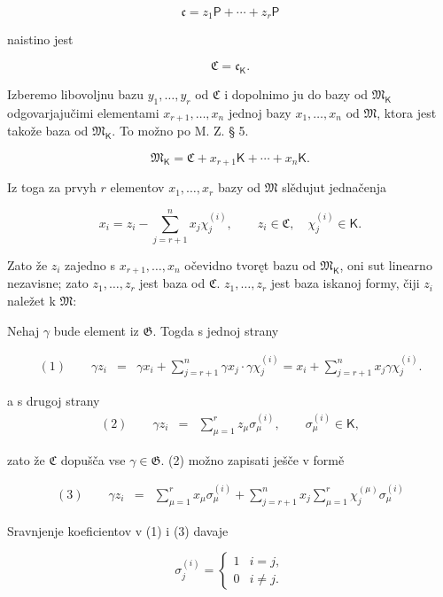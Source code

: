 \documentclass[11pt]{article}
\begin{document}
\[
\mathfrak c=z_1\mathsf P+\cdots+z_r\mathsf P
\]

naistino jest

\[
\mathfrak C=\mathfrak c_{\mathsf K}.
\]

Izberemo libovoljnu bazu \(y_1,\ldots,y_r\) od \(\mathfrak C\) i dopolnimo ju do bazy od \(\mathfrak M_{\mathsf K}\) odgovarjajučimi elementami \(x_{r+1},\ldots,x_n\) jednoj bazy \(x_1,\ldots,x_n\) od \(\mathfrak M\), ktora jest takože baza od \(\mathfrak M_{\mathsf K}\). To možno po M. Z. § 5.

\[
\mathfrak M_{\mathsf K}=\mathfrak C+x_{r+1}\mathsf K+\cdots+x_n\mathsf K.
\]

Iz toga za prvyh \(r\) elementov \(x_1,\ldots,x_r\) bazy od \(\mathfrak M\) slědujut jednačenja

\[
x_i=z_i-\sum_{j=r+1}^{n}x_j\chi_j^{(i)},\qquad
z_i\in\mathfrak C,\quad \chi_j^{(i)}\in\mathsf K.
\]

Zato že \(z_i\) zajedno s \(x_{r+1},\ldots,x_n\) očevidno tvoręt bazu od \(\mathfrak M_{\mathsf K}\), oni sut linearno nezavisne; zato \(z_1,\ldots,z_r\) jest baza od \(\mathfrak C\). \(z_1,\ldots,z_r\) jest baza iskanoj formy, čiji \(z_i\) naležet k \(\mathfrak M\):

Nehaj \(\gamma\) bude element iz \(\mathfrak G\). Togda s jednoj strany

\[
\begin{array}{rcl}
(1)\qquad \gamma z_i
&=&\gamma x_i+\displaystyle\sum_{j=r+1}^{n}\gamma x_j\cdot \gamma\chi_j^{(i)}
=x_i+\displaystyle\sum_{j=r+1}^{n}x_j\gamma\chi_j^{(i)}.
\end{array}
\]

a s drugoj strany
\[
\begin{array}{rcl}
(2)\qquad \gamma z_i&=&\displaystyle\sum_{\mu=1}^{r}z_\mu\sigma_\mu^{(i)},
\qquad \sigma_\mu^{(i)}\in\mathsf K,
\end{array}
\]

zato že \(\mathfrak C\) dopušča vse \(\gamma\in\mathfrak G\). (2) možno zapisati ješče v formě

\[
\begin{array}{rcl}
(3)\qquad \gamma z_i
&=&\displaystyle\sum_{\mu=1}^{r}x_\mu\sigma_\mu^{(i)}
+\displaystyle\sum_{j=r+1}^{n}x_j\sum_{\mu=1}^{r}\chi_j^{(\mu)}\sigma_\mu^{(i)}
\end{array}
\]

Sravnjenje koeficientov v (1) i (3) davaje

\[
\sigma_j^{(i)}=
\begin{cases}
1 & i=j,\\
0 & i\ne j.
\end{cases}
\]
\end{document}
